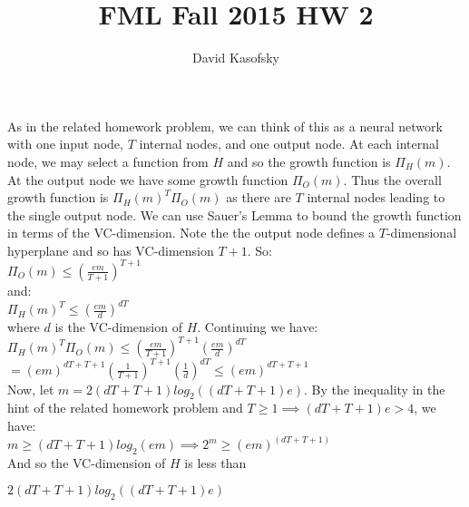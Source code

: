 \documentclass[]{article}
\title{FML Fall 2015 HW 2}
\author{David Kasofsky}
\begin{document}
\section{}
\subsection{}
As in the related homework problem, we can think of this as a neural network with one input node, $T$ internal nodes, and one output node. At each internal node, we may select a function from $H$ and so the growth function is $\Pi_H(m)$. At the output node we have some growth function $\Pi_O(m)$. Thus the overall growth function is $\Pi_H(m)^T\Pi_O(m)$ as there are $T$ internal nodes leading to the single output node. We can use Sauer's Lemma to bound the growth function in terms of the VC-dimension. Note the the output node defines a $T$-dimensional hyperplane and so has VC-dimension $T+1$. So:\\

$\Pi_O(m) \le (\frac{e m}{T+1})^{T+1}$\\

and:\\ 

$\Pi_H(m)^T \le (\frac{e m}{d})^{dT} $\\

where $d$ is the VC-dimension of $H$. Continuing we have:\\

$\Pi_H(m)^T\Pi_O(m) \le (\frac{e m}{T+1})^{T+1} (\frac{e m}{d})^{dT}$\\

$= (e m)^{dT+T+1} (\frac{1}{T+1})^{T+1} (\frac{1}{d})^{dT} \le (e m)^{dT+T+1}$\\

Now, let $m = 2(dT+T+1)log_2((dT+T+1)e)$. By the inequality in the hint of the related homework problem and $T \ge 1 \implies (dT+T+1)e > 4$, we have:\\

$m \ge (dT+T+1) log_2(e m) \implies 2^m \ge (e m)^{(dT+T+1)}$\\

And so the VC-dimension of $H$ is less than
\begin{center}
	$2(dT+T+1)log_2((dT+T+1)e)$
\end{center}

\pagebreak

\section{}
\end{document}
